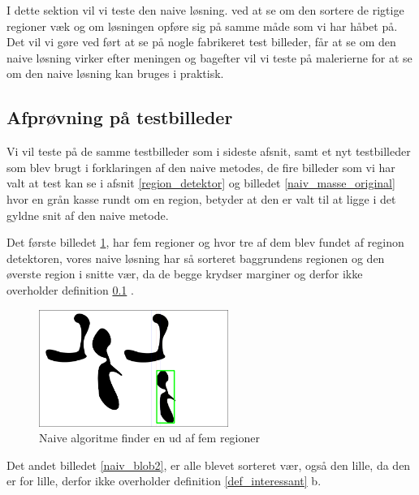 {\sffamily
I dette sektion vil vi teste den naive løsning. ved at se om den sortere
de rigtige regioner væk og om løsningen opføre sig på samme måde som vi
har håbet på. Det vil vi gøre ved ført at se på nogle fabrikeret test
billeder, får at se om den naive løsning virker efter meningen og
bagefter vil vi teste på malerierne for at se om den naive løsning kan
bruges i praktisk.
}
  
\subsection{Afprøvning på testbilleder}
Vi vil teste på de samme testbilleder som i sideste afsnit, samt et nyt
testbilleder som blev brugt i forklaringen af den naive metodes, de fire
billeder som vi har valt at test kan se i afsnit \ref{region_detektor}
og billedet \ref{naiv_masse_original} hvor en grån kasse rundt om en
region, betyder at den er valt til at ligge i det gyldne snit af den
naive metode. 

Det første billedet \ref{naiv_blob1}, har fem regioner og hvor tre af
dem blev fundet af reginon detektoren, vores naive løsning har så
sorteret baggrundens regionen og den øverste region i snitte vær, da de
begge krydser marginer og derfor ikke overholder definition
\ref{} . 

\begin{figure}[!h]
	\begin{center}
        \includegraphics[angle=0,width=0.55\textwidth]{afsnit/afprovning/billeder/naive_losning/naiv_blob1.png}
	\end{center}       
	\caption{Naive algoritme finder en ud af fem regioner}	
	\label{naiv_blob1}
\end{figure}

Det andet billedet \ref{naiv_blob2}, er alle blevet sorteret vær, også
den lille, da den er for lille, derfor ikke overholder definition
\ref{def_interessant} b. 

